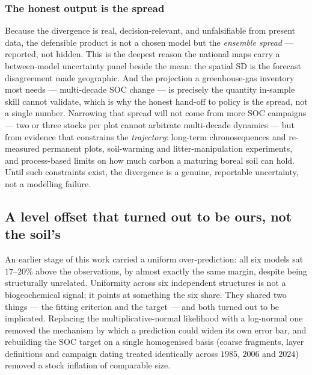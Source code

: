 \documentclass[11pt]{article}
\begin{document}
\subsubsection{The honest output is the spread}
Because the divergence is real, decision-relevant, and unfalsifiable from present data,
the defensible product is not a chosen model but the \emph{ensemble spread} --- reported,
not hidden. This is the deepest reason the national maps carry a between-model
uncertainty panel beside the mean: the spatial SD is the forecast disagreement made
geographic. And the projection a greenhouse-gas inventory most needs --- multi-decade SOC
change --- is precisely the quantity in-sample skill cannot validate, which is why the
honest hand-off to policy is the spread, not a single number.
Narrowing that spread will not come from more SOC campaigns --- two or three stocks per
plot cannot arbitrate multi-decade dynamics --- but from evidence that constrains the
\emph{trajectory}: long-term chronosequences and re-measured permanent plots, soil-warming
and litter-manipulation experiments, and process-based limits on how much carbon a maturing
boreal soil can hold. Until such constraints exist, the divergence is a genuine, reportable
uncertainty, not a modelling failure.

\subsection{A level offset that turned out to be ours, not the soil's}
%
An earlier stage of this work carried a uniform over-prediction: all six models
sat $17$--$20\%$ above the observations, by almost exactly the same margin,
despite being structurally unrelated. Uniformity across six independent
structures is not a biogeochemical signal; it points at something the six share.
They shared two things --- the fitting criterion and the target --- and both
turned out to be implicated. Replacing the multiplicative-normal likelihood with
a log-normal one removed the mechanism by which a prediction could widen its own
error bar, and rebuilding the SOC target on a single homogenised basis (coarse
fragments, layer definitions and campaign dating treated identically across
$1985$, $2006$ and $2024$) removed a stock inflation of comparable size.
\end{document}
